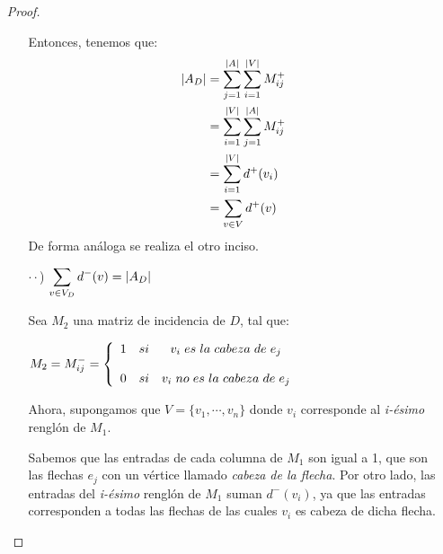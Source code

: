 \documentclass{article}
\begin{document}
\begin{enumerate}
\begin{proof}
\begin{itemize}
      Entonces, tenemos que:
      \begin{equation*}
        \begin{split}
          \abs{A_{D}} & = \sum_{j=1}^{\abs{A}} \sum_{i=1}^{\abs{V}} M^{+}_{ij} \\
          & = \sum_{i=1}^{\abs{V}} \sum_{j=1}^{\abs{A}} M^{+}_{ij} \\
          & = \sum_{i=1}^{\abs{V}} d^{+}(v_{i}) \\
          & = \sum_{v \in V} d^{+}(v)
        \end{split}
      \end{equation*}
      De forma análoga se realiza el otro inciso.
      
    \item[$\cdot\cdot$)] $\displaystyle \sum_{v \in V_{D}} d^{-}(v) = \abs{A_{D}}$ 
      
      Sea $M_{2}$ una matriz de incidencia de $D$, tal que:
      \begin{center}
        $M_{2} = M^{-}_{ij}
        = \left \{ 
        \begin{array}{lcc}
          1 &   si  & v_{i} \hspace{0.3em} es \hspace{0.3em} la \hspace{0.3em}
          cabeza \hspace{0.3em} de \hspace{0.3em} e_{j} \\
          \\0 &  si & v_{i} \hspace{0.3em} no \hspace{0.3em} es \hspace{0.3em}
          la \hspace{0.3em} cabeza \hspace{0.3em} de \hspace{0.3em} e_{j}
        \end{array}
        \right.$
      \end{center}
      Ahora, supongamos que $V = \{v_{1}, \cdots, v_{n}\}$ donde $v_{i}$
      corresponde al \textit{i-ésimo} renglón de $M_{1}$.
      
      Sabemos que las entradas de cada columna de $M_{1}$ son igual a 1,
      que son las flechas $e_{j}$ con un vértice llamado \textit{cabeza de la flecha}.
      Por otro lado, las entradas del \textit{i-ésimo} renglón de $M_{1}$
      suman $d^{-}(v_{i})$, ya que las entradas corresponden a todas las
      flechas de las cuales $v_{i}$ es cabeza de dicha flecha. 
      

\end{itemize}
\end{proof}
\end{enumerate}
\end{document}
